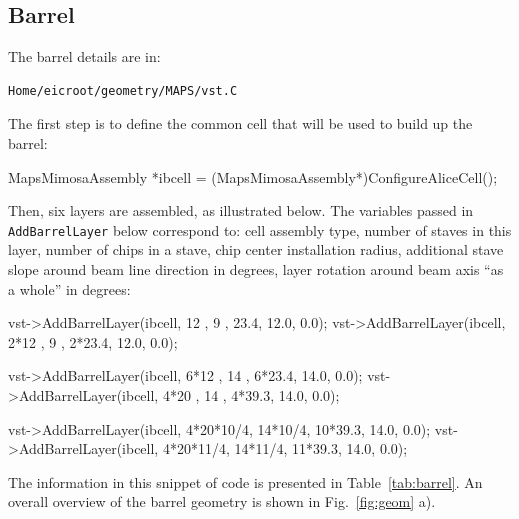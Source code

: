 \documentclass[12pt]{article}
\begin{document}
\subsection{Barrel}

The barrel details are in:

\begin{tcolorbox}
\begin{verbatim}
Home/eicroot/geometry/MAPS/vst.C
\end{verbatim}  
\end{tcolorbox}

The first step is to define the common cell that will be used to build up the barrel:

\begin{tcolorbox}
\begin{verbnobox}[\scriptsize]
MapsMimosaAssembly *ibcell = (MapsMimosaAssembly*)ConfigureAliceCell();
\end{verbnobox}  
\end{tcolorbox}

Then, six layers are assembled, as illustrated below. The variables passed in \verb|AddBarrelLayer| below correspond to:
cell assembly type,
number of staves in this layer,
number of chips in a stave,
chip center installation radius,
additional stave slope around beam line direction in degrees,
layer rotation around beam axis ``as a whole'' in degrees:

\begin{tcolorbox}
\begin{verbnobox}[\scriptsize]
vst->AddBarrelLayer(ibcell,   12     ,  9     ,    23.4, 12.0, 0.0);
vst->AddBarrelLayer(ibcell, 2*12     ,  9     ,  2*23.4, 12.0, 0.0);

vst->AddBarrelLayer(ibcell, 6*12     , 14     ,  6*23.4, 14.0, 0.0);
vst->AddBarrelLayer(ibcell, 4*20     , 14     ,  4*39.3, 14.0, 0.0);

vst->AddBarrelLayer(ibcell, 4*20*10/4, 14*10/4, 10*39.3, 14.0, 0.0);
vst->AddBarrelLayer(ibcell, 4*20*11/4, 14*11/4, 11*39.3, 14.0, 0.0);
\end{verbnobox}  
\end{tcolorbox}

The information in this snippet of code is presented in Table~\ref{tab:barrel}.
An overall overview of the barrel geometry is shown in Fig.~\ref{fig:geom} a).
\end{document}
